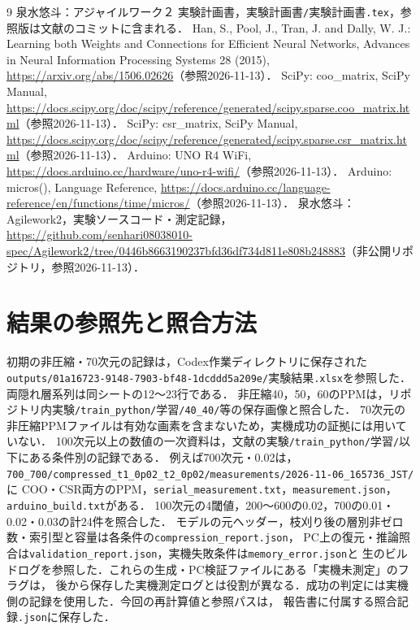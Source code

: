 \documentclass[a4paper,11pt]{article}
\newcommand{\code}[1]{\nolinkurl{#1}}
\begin{document}
\clearpage
\begin{thebibliography}{9}\small
{} 泉水悠斗：アジャイルワーク２ 実験計画書，実験計画書\code{/}実験計画書\code{.tex}，参照版は文献\cite{repo}のコミットに含まれる．
 Han, S., Pool, J., Tran, J. and Dally, W. J.: Learning both Weights and Connections for Efficient Neural Networks, Advances in Neural Information Processing Systems 28 (2015), \url{https://arxiv.org/abs/1506.02626}（参照2026-11-13）．
 SciPy: coo\_matrix, SciPy Manual, \url{https://docs.scipy.org/doc/scipy/reference/generated/scipy.sparse.coo_matrix.html}（参照2026-11-13）．
 SciPy: csr\_matrix, SciPy Manual, \url{https://docs.scipy.org/doc/scipy/reference/generated/scipy.sparse.csr_matrix.html}（参照2026-11-13）．
 Arduino: UNO R4 WiFi, \url{https://docs.arduino.cc/hardware/uno-r4-wifi/}（参照2026-11-13）．
 Arduino: micros(), Language Reference, \url{https://docs.arduino.cc/language-reference/en/functions/time/micros/}（参照2026-11-13）．
 泉水悠斗：Agilework2，実験ソースコード・測定記録，\url{https://github.com/senhari08038010-spec/Agilework2/tree/0446b8663190237bfd36df734d811e808b248883}（非公開リポジトリ，参照2026-11-13）．
\end{thebibliography}

\clearpage
\appendix
\section{結果の参照先と照合方法}

初期の非圧縮・70次元の記録は，Codex作業ディレクトリに保存された\code{outputs/01a16723-9148-7903-bf48-1dcddd5a209e/}実験結果\code{.xlsx}を参照した．両隠れ層系列は同シートの12〜23行である．
非圧縮40，50，60のPPMは，リポジトリ内実験\code{/train_python/}学習\code{/40_40/}等の保存画像と照合した．
70次元の非圧縮PPMファイルは有効な画素を含まないため，実機成功の証拠には用いていない．
100次元以上の数値の一次資料は，文献\cite{repo}の実験\code{/train_python/}学習\code{/}以下にある条件別の記録である．
例えば700次元・0.02は，\code{700_700/compressed_t1_0p02_t2_0p02/measurements/2026-11-06_165736_JST/}に
COO・CSR両方のPPM，\code{serial_measurement.txt}，\code{measurement.json}，\code{arduino_build.txt}がある．
100次元の4閾値，200〜600の0.02，700の0.01・0.02・0.03の計24件を照合した．
モデルの元ヘッダー，枝刈り後の層別非ゼロ数・索引型と容量は各条件の\code{compression_report.json}，
PC上の復元・推論照合は\code{validation_report.json}，実機失敗条件は\code{memory_error.json}と
生のビルドログを参照した．これらの生成・PC検証ファイルにある「実機未測定」のフラグは，
後から保存した実機測定ログとは役割が異なる．成功の判定には実機側の記録を使用した．今回の再計算値と参照パスは，
報告書に付属する照合記録\code{.json}に保存した．
\end{document}
